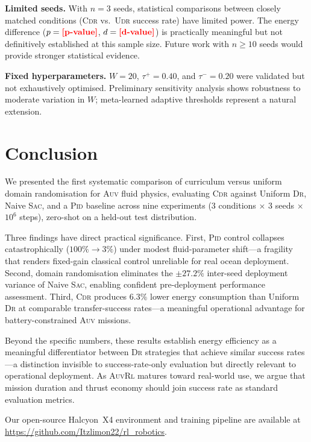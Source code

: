 \documentclass[letterpaper,10pt,journal]{IEEEtran}
\newcommand{\CDR}{\textsc{Cdr}\xspace}
\newcommand{\UDR}{\textsc{Udr}\xspace}
\newcommand{\SAC}{\textsc{Sac}\xspace}
\newcommand{\PID}{\textsc{Pid}\xspace}
\newcommand{\AUV}{\textsc{Auv}\xspace}
\newcommand{\DR}{\textsc{Dr}\xspace}
\newcommand{\RL}{\textsc{Rl}\xspace}
\newcommand{\FILL}[1]{{\color{red}\textbf{[#1]}}}
\begin{document}
\textbf{Limited seeds.}
With $n=3$ seeds, statistical comparisons between closely matched
conditions (\CDR vs.\ \UDR success rate) have limited power.
The energy difference ($p=\FILL{p-value}$, $d=\FILL{d-value}$) is
practically meaningful but not definitively established at this sample size.
Future work with $n\!\geq\!10$ seeds would provide stronger statistical evidence.

\textbf{Fixed hyperparameters.}
$W=20$, $\tau^+=0.40$, and $\tau^-=0.20$ were validated but not
exhaustively optimised.
Preliminary sensitivity analysis shows robustness to moderate variation
in $W$; meta-learned adaptive thresholds represent a natural extension.

\section{Conclusion}
\label{sec:conclusion}

We presented the first systematic comparison of curriculum versus uniform
domain randomisation for \AUV fluid physics, evaluating \CDR against
Uniform \DR, Naive \SAC, and a \PID baseline across nine experiments
($3$ conditions $\times$ $3$ seeds $\times$ $10^6$ steps), zero-shot
on a held-out test distribution.

Three findings have direct practical significance.
First, \PID control collapses catastrophically ($100\%\to3\%$) under
modest fluid-parameter shift---a fragility that renders fixed-gain
classical control unreliable for real ocean deployment.
Second, domain randomisation eliminates the $\pm27.2\%$ inter-seed
deployment variance of Naive \SAC, enabling confident pre-deployment
performance assessment.
Third, \CDR produces $6.3\%$ lower energy consumption than Uniform \DR
at comparable transfer-success rates---a meaningful operational
advantage for battery-constrained \AUV missions.

Beyond the specific numbers, these results establish energy efficiency
as a meaningful differentiator between \DR strategies that achieve similar
success rates---a distinction invisible to success-rate-only evaluation
but directly relevant to operational deployment.
As \AUV \RL matures toward real-world use, we argue that mission duration
and thrust economy should join success rate as standard evaluation metrics.

Our open-source Halcyon~X4 environment and training pipeline are
available at \url{https://github.com/Itzlimon22/rl_robotics}.
\end{document}
